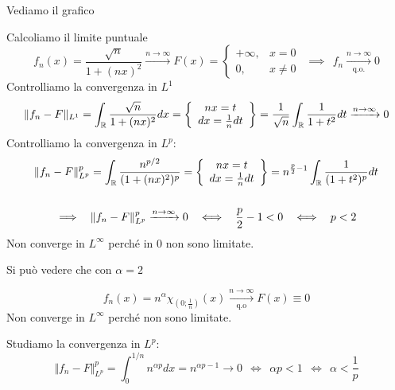 Vediamo il grafico


Calcoliamo il limite puntuale
\begin{equation*}
f_{n} (x)=\frac{\sqrt{n}}{1+(nx)^{2}}\xrightarrow{n\rightarrow \infty } F(x)=\begin{cases}
+\infty , & x=0\\
0, & x\neq 0
\end{cases} \ \ \implies \ \ f_{n}\xrightarrow[\text{q.o.}]{n\rightarrow \infty } 0
\end{equation*}
Controlliamo la convergenza in $L^{1}$
\begin{equation*}
\Vert f_{n} -F\Vert _{L^{1}} =\int _{\mathbb{R} }\frac{\sqrt{n}}{1+(nx)^{2}} dx=\left\{\begin{array}{ c }
nx=t\\
dx=\frac{1}{n} dt
\end{array}\right\} =\frac{1}{\sqrt{n}}\int _{\mathbb{R} }\frac{1}{1+t^{2}} dt\xrightarrow{n\rightarrow \infty } 0
\end{equation*}
Controlliamo la convergenza in $L^{p}$:
\begin{gather*}
\Vert f_{n} -F\Vert ^{p}_{L^{p}} =\int _{\mathbb{R} }\frac{n^{p/2}}{(1+(nx)^{2} )^{p}} =\left\{\begin{array}{ c }
nx=t\\
dx=\frac{1}{n} dt
\end{array}\right\} =n^{\frac{p}{2} -1}\int _{\mathbb{R} }\frac{1}{(1+t^{2} )^{p}} dt\\
\\
\implies \ \ \Vert f_{n} -F\Vert ^{p}_{L^{p}}\xrightarrow{n\rightarrow \infty } 0\ \ \iff \ \ \frac{p}{2} -1< 0\ \ \iff \ \ p< 2
\end{gather*}
Non converge in $L^{\infty }$ perché in $0$ non sono limitate.
\Soluzione

Si può vedere che con $\alpha =2$

\begin{equation*}
f_{n} (x)=n^{\alpha } \chi _{\left( 0;\frac{1}{n}\right)} (x)\xrightarrow[\text{q.o}]{n\rightarrow \infty } F(x)\equiv 0
\end{equation*}
Non converge in $L^{\infty }$ perché non sono limitate.

Studiamo la convergenza in $L^{p}$:
\begin{equation*}
\Vert f_{n} -F\Vert ^{p}_{L^{p}} =\int ^{1/n}_{0} n^{\alpha p} dx=n^{\alpha p-1}\rightarrow 0\ \ \iff \ \ \alpha p< 1\ \ \iff \ \ \alpha < \frac{1}{p}
\end{equation*}
\Soluzione

